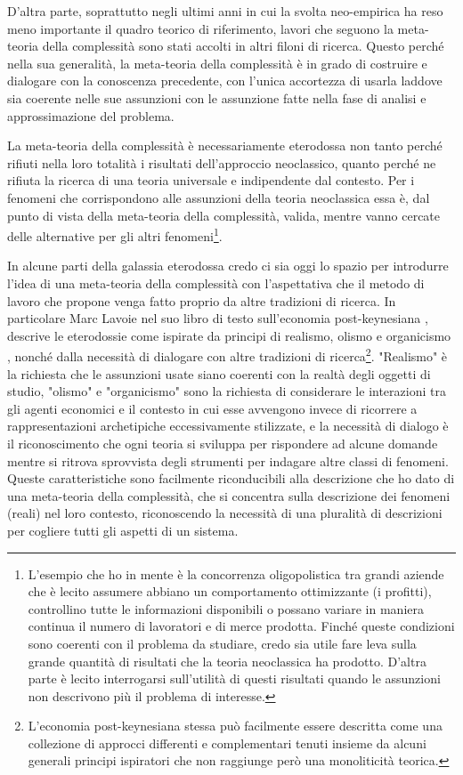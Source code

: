 \documentclass[a4paper, headings=standardclasses]{scrartcl}
\begin{document}
D'altra parte, soprattutto negli ultimi anni in cui la svolta neo-empirica ha reso meno importante il quadro teorico di riferimento, lavori che seguono la meta-teoria della complessità sono stati accolti in altri filoni di ricerca.
Questo perché nella sua generalità, la meta-teoria della complessità è in grado di costruire e dialogare con la conoscenza precedente, con l'unica accortezza di usarla laddove sia coerente nelle sue assunzioni con le assunzione fatte nella fase di analisi e approssimazione del problema.

La meta-teoria della complessità è necessariamente eterodossa \parencite{fontana2010} non tanto perché rifiuti nella loro totalità i risultati dell'approccio neoclassico, quanto perché ne rifiuta la ricerca di una teoria universale e indipendente dal contesto.
Per i fenomeni che corrispondono alle assunzioni della teoria neoclassica essa è, dal punto di vista della meta-teoria della complessità, valida, mentre vanno cercate delle alternative per gli altri fenomeni\footnote{L'esempio che ho in mente è la concorrenza oligopolistica tra grandi aziende che è lecito assumere abbiano un comportamento ottimizzante (i profitti), controllino tutte le informazioni disponibili o possano variare in maniera continua il numero di lavoratori e di merce prodotta. Finché queste condizioni sono coerenti con il problema da studiare, credo sia utile fare leva sulla grande quantità di risultati che la teoria neoclassica ha prodotto. D'altra parte è lecito interrogarsi sull'utilità di questi risultati quando le assunzioni non descrivono più il problema di interesse.}.

In alcune parti della galassia eterodossa credo ci sia oggi lo spazio per introdurre l'idea di una meta-teoria della complessità con l'aspettativa che il metodo di lavoro che propone venga fatto proprio da altre tradizioni di ricerca.
In particolare Marc Lavoie nel suo libro di testo sull'economia post-keynesiana \parencite{lavoie2022}, descrive le eterodossie come ispirate da principi di realismo, olismo e organicismo \parencite[][p. 12]{lavoie2022}, nonché dalla necessità di dialogare con altre tradizioni di ricerca\footnote{L'economia post-keynesiana stessa può facilmente essere descritta come una collezione di approcci differenti e complementari tenuti insieme da alcuni generali principi ispiratori che non raggiunge però una monoliticità teorica.}. "Realismo" è la richiesta che le assunzioni usate siano coerenti con la realtà degli oggetti di studio, "olismo" e "organicismo" sono la richiesta di considerare le interazioni tra gli agenti economici e il contesto in cui esse avvengono invece di ricorrere a rappresentazioni archetipiche eccessivamente stilizzate, e la necessità di dialogo è il riconoscimento che ogni teoria si sviluppa per rispondere ad alcune domande mentre si ritrova sprovvista degli strumenti per indagare altre classi di fenomeni.
Queste caratteristiche sono facilmente riconducibili alla descrizione che ho dato di una meta-teoria della complessità, che si concentra sulla descrizione dei fenomeni (reali) nel loro contesto, riconoscendo la necessità di una pluralità di descrizioni per cogliere tutti gli aspetti di un sistema.
\end{document}
